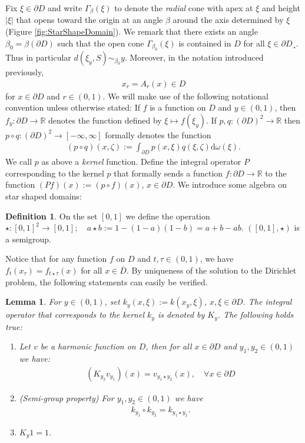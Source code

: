 \documentclass[a4paper,12pt]{article}
\newtheorem{lemma}[theorem]{Lemma}
\theoremstyle{definition}
\theoremstyle{definition}
\newtheorem{definition}[theorem]{Definition}%
\begin{document}
	Fix $\xi\in\partial D$ and write $\Gamma_\beta(\xi)$ to denote the \textit{radial} cone with apex at $\xi$ and height $|\xi|$ that opens toward the origin at an angle $\beta$ around the axis determined by $\xi$ (Figure \ref{fig:StarShapeDomain}). We remark that there exists an angle $\beta_0=\beta(\partial D)$ such that the open cone $\Gamma_{\beta_0}(\xi)$ is contained in $D$ for all $\xi\in\partial D¸$. Thus in particular $d(\xi_y,S)\sim_{\beta_0} y$. Moreover, in the notation introduced previously,
	\begin{align*}
		x_{r}=A_{r}(x)\in D
	\end{align*}
	for $x\in\partial D$ and $r\in(0,1)$. We will make use of the following notational convention unless otherwise stated: If $f$ is a function on $D$ and $y\in(0,1)$, then $f_y:\partial D\rightarrow\mathbb R$ denotes the function defined by $\xi\mapsto f(\xi_y)$. If $p,q:(\partial D)^2\rightarrow\mathbb R$ then $p\circ q:(\partial D)^2\rightarrow[-\infty,\infty]$ formally denotes the function
	\begin{align*}
		(p\circ q)(x,\zeta):=\int_{\partial D}p(x,\xi)q(\xi,\zeta)\mathrm d\omega(\xi).
	\end{align*}  
	We call $p$ as above a \textit{kernel} function. Define the integral operator $P$ corresponding to the kernel $p$ that formally sends a function $f:\partial D\rightarrow\mathbb R$ to the function $(Pf)(x):=(p\circ f)(x)$, $x\in\partial D$. We introduce some algebra on star shaped domains:
	\begin{definition}
		On the set $[0,1]$ we define the operation $\star:[0,1]^2\rightarrow[0,1];\quad a\star b:=1-(1-a)(1-b)=a+b-ab$. $([0,1],\star)$ is a semigroup. 
	\end{definition}
	Notice that for any function $f$ on $D$ and $t,\tau\in(0,1)$, we have $f_t(x_\tau)=f_{t\star\tau}(x)$ for all $x\in \overline D$. By uniqueness of the solution to the Dirichlet problem, the following statements can easily be verified.
	\begin{lemma}\label{lem:MartinKernel}
		For $y\in(0,1)$, set $k_y(x,\xi):=k(x_y,\xi)$, $x,\xi\in\partial D$. The integral operator that corresponds to the kernel $k_y$ is denoted by $K_y$. The following holds true:
		\begin{enumerate}
			\item Let $v$ be a harmonic function on $D$, then for all $x\in \partial D$ and $y_1,y_2\in(0,1)$ we have:
			\begin{align*}
				(K_{y_2}v_{y_1})(x) = v_{y_1\star y_2}(x), \quad \forall x\in\partial D
			\end{align*}
			\item (Semi-group property) For $y_1,y_2\in(0,1)$ we have 
			\begin{align*}
				k_{y_1}\circ k_{y_2} = k_{y_1\star y_2}.	
			\end{align*}
			\item $K_y1=1$.
		\end{enumerate}
	\end{lemma}
\end{document}
